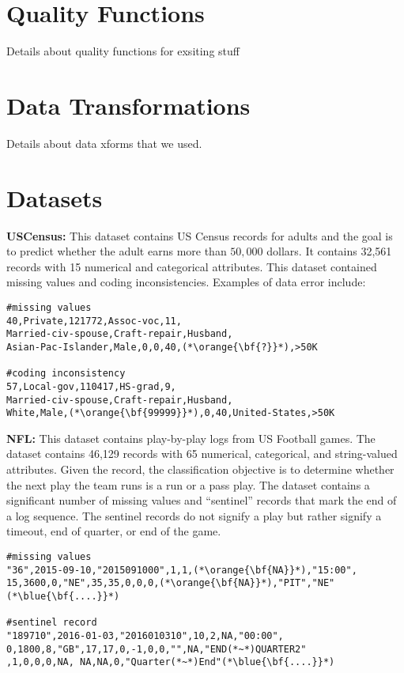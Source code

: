 \appendix
\label{s:appendix}

\section{Quality Functions}
Details about quality functions for exsiting stuff

\section{Data Transformations}

Details about data xforms that we used.

\section{Datasets}
\vspace{0.5em}\noindent\textbf{USCensus: } This dataset contains US Census records for adults and the goal is to predict  whether the adult earns more than $50,000$ dollars. It contains 32,561 records with 15 numerical and categorical attributes. This dataset contained missing values and coding inconsistencies.
Examples of data error include:
\begin{lstlisting}
#missing values
40,Private,121772,Assoc-voc,11,
Married-civ-spouse,Craft-repair,Husband, 
Asian-Pac-Islander,Male,0,0,40,(*\orange{\bf{?}}*),>50K

#coding inconsistency
57,Local-gov,110417,HS-grad,9,
Married-civ-spouse,Craft-repair,Husband,
White,Male,(*\orange{\bf{99999}}*),0,40,United-States,>50K
\end{lstlisting}


\vspace{0.5em}\noindent\textbf{NFL: } This dataset contains play-by-play logs from US Football games. The dataset contains 46,129 records with 65 numerical, categorical, and string-valued attributes. Given the record, the classification objective is to determine whether the next play the team runs is a run or a pass play.
The dataset contains a significant number of missing values and ``sentinel'' records that mark the end of a log sequence. The sentinel records do not signify a play but rather signify a timeout, end of quarter, or end of the game.
\begin{lstlisting}
#missing values
"36",2015-09-10,"2015091000",1,1,(*\orange{\bf{NA}}*),"15:00",
15,3600,0,"NE",35,35,0,0,0,(*\orange{\bf{NA}}*),"PIT","NE"(*\blue{\bf{....}}*)

#sentinel record
"189710",2016-01-03,"2016010310",10,2,NA,"00:00",
0,1800,8,"GB",17,17,0,-1,0,0,"",NA,"END(*~*)QUARTER2"
,1,0,0,0,NA, NA,NA,0,"Quarter(*~*)End"(*\blue{\bf{....}}*)
\end{lstlisting}





